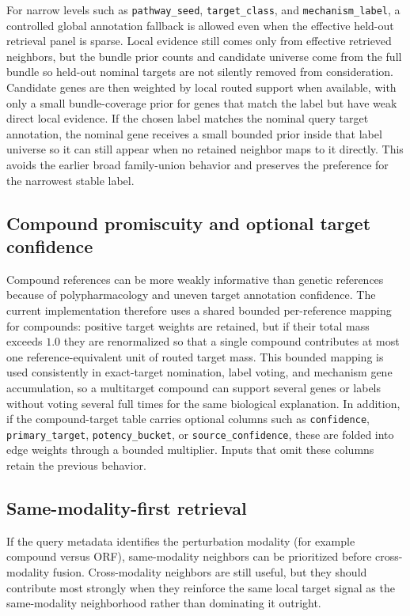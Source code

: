 \documentclass[11pt]{article}
\begin{document}
For narrow levels such as \texttt{pathway\_seed}, \texttt{target\_class}, and \texttt{mechanism\_label}, a controlled global annotation fallback is allowed even when the effective held-out retrieval panel is sparse. Local evidence still comes only from effective retrieved neighbors, but the bundle prior counts and candidate universe come from the full bundle so held-out nominal targets are not silently removed from consideration. Candidate genes are then weighted by local routed support when available, with only a small bundle-coverage prior for genes that match the label but have weak direct local evidence. If the chosen label matches the nominal query target annotation, the nominal gene receives a small bounded prior inside that label universe so it can still appear when no retained neighbor maps to it directly. This avoids the earlier broad family-union behavior and preserves the preference for the narrowest stable label.

\subsection{Compound promiscuity and optional target confidence}
Compound references can be more weakly informative than genetic references because of polypharmacology and uneven target annotation confidence. The current implementation therefore uses a shared bounded per-reference mapping for compounds: positive target weights are retained, but if their total mass exceeds $1.0$ they are renormalized so that a single compound contributes at most one reference-equivalent unit of routed target mass. This bounded mapping is used consistently in exact-target nomination, label voting, and mechanism gene accumulation, so a multitarget compound can support several genes or labels without voting several full times for the same biological explanation. In addition, if the compound-target table carries optional columns such as \texttt{confidence}, \texttt{primary\_target}, \texttt{potency\_bucket}, or \texttt{source\_confidence}, these are folded into edge weights through a bounded multiplier. Inputs that omit these columns retain the previous behavior.

\subsection{Same-modality-first retrieval}
If the query metadata identifies the perturbation modality (for example compound versus ORF), same-modality neighbors can be prioritized before cross-modality fusion. Cross-modality neighbors are still useful, but they should contribute most strongly when they reinforce the same local target signal as the same-modality neighborhood rather than dominating it outright.
\end{document}

